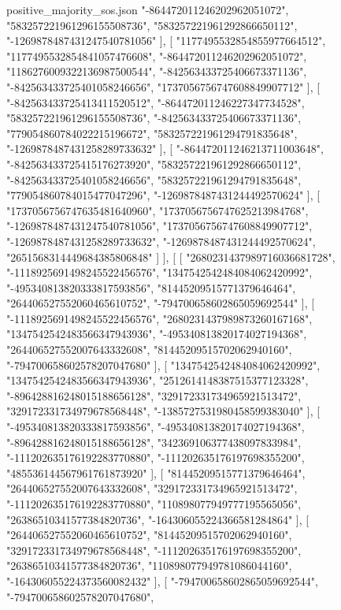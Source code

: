 \begin{filecontents*}[overwrite]{positive_majority_sos.json}
    "-864472011246202962051072",
    "583257221961296155508736",
    "583257221961292866650112",
    "-1269878487431247540781056"
   ],
   [
    "1177495532854855977664512",
    "1177495532854841057476608",
    "-864472011246202962051072",
    "1186276009322136987500544",
    "-842563433725406673371136",
    "-842563433725401058246656",
    "1737056756747608849907712"
   ],
   [
    "-842563433725413411520512",
    "-864472011246227347734528",
    "583257221961296155508736",
    "-842563433725406673371136",
    "779054860784022215196672",
    "583257221961294791835648",
    "-1269878487431258289733632"
   ],
   [
    "-864472011246213711003648",
    "-842563433725415176273920",
    "583257221961292866650112",
    "-842563433725401058246656",
    "583257221961294791835648",
    "779054860784015477047296",
    "-1269878487431244492570624"
   ],
   [
    "1737056756747635481640960",
    "1737056756747625213984768",
    "-1269878487431247540781056",
    "1737056756747608849907712",
    "-1269878487431258289733632",
    "-1269878487431244492570624",
    "2651568314449684385806848"
   ]
  ],
  [
   [
    "2680231437989716036681728",
    "-1118925691498245522456576",
    "1347542542484084062420992",
    "-495340813820333817593856",
    "81445209515771379646464",
    "264406527552060465610752",
    "-794700658602865059692544"
   ],
   [
    "-1118925691498245522456576",
    "2680231437989873260167168",
    "1347542542483566347943936",
    "-495340813820174027194368",
    "264406527552007643332608",
    "81445209515702062940160",
    "-794700658602578207047680"
   ],
   [
    "1347542542484084062420992",
    "1347542542483566347943936",
    "2512614148387515377123328",
    "-896428816248015188656128",
    "329172331734965921513472",
    "329172331734979678568448",
    "-1385727531980458599383040"
   ],
   [
    "-495340813820333817593856",
    "-495340813820174027194368",
    "-896428816248015188656128",
    "342369106377438097833984",
    "-111202635176192283770880",
    "-111202635176197698355200",
    "485536144567961761873920"
   ],
   [
    "81445209515771379646464",
    "264406527552007643332608",
    "329172331734965921513472",
    "-111202635176192283770880",
    "110898077949777195565056",
    "26386510341577384820736",
    "-164306055224366581284864"
   ],
   [
    "264406527552060465610752",
    "81445209515702062940160",
    "329172331734979678568448",
    "-111202635176197698355200",
    "26386510341577384820736",
    "110898077949781086044160",
    "-164306055224373560082432"
   ],
   [
    "-794700658602865059692544",
    "-794700658602578207047680",

\end{filecontents*}
